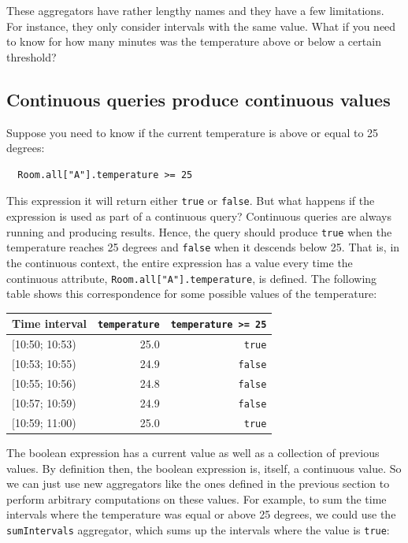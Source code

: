 \documentclass[a4,11pt]{report}
\begin{document}
These aggregators have rather lengthy names and they have a few
limitations. For instance, they only consider intervals with the same
value. What if you need to know for how many minutes was the
temperature above or below a certain threshold?

\subsection{Continuous queries produce continuous values}

Suppose you need to know if the current temperature is above or equal
to 25 degrees:

\begin{lstlisting}
  Room.all["A"].temperature >= 25
\end{lstlisting}

This expression it will return either \verb=true= or \verb=false=. But
what happens if the expression is used as part of a continuous query?
Continuous queries are always running and producing results. Hence,
the query should produce \verb=true= when the temperature reaches 25
degrees and \verb=false= when it descends below 25. That is, in the
continuous context, the entire expression has a value every time the
continuous attribute, \verb=Room.all["A"].temperature=, is
defined. The following table shows this correspondence for some
possible values of the temperature:

\begin{tabular}{ |l|r|r| }
  \hline
  Time interval & \verb=temperature= & \verb!temperature >= 25! \\
  \hline
  $[$10:50; 10:53) & 25.0 & \verb=true=  \\
  $[$10:53; 10:55) & 24.9 & \verb=false= \\
  $[$10:55; 10:56) & 24.8 & \verb=false= \\
  $[$10:57; 10:59) & 24.9 & \verb=false= \\
  $[$10:59; 11:00) & 25.0 & \verb=true=  \\
  \hline
\end{tabular}

The boolean expression has a current value as well as a collection of
previous values. By definition then, the boolean expression is,
itself, a continuous value. So we can just use new aggregators like
the ones defined in the previous section to perform arbitrary
computations on these values. For example, to sum the time intervals
where the temperature was equal or above 25 degrees, we could use the
\verb=sumIntervals= aggregator, which sums up the intervals where the
value is \verb=true=:
\end{document}
